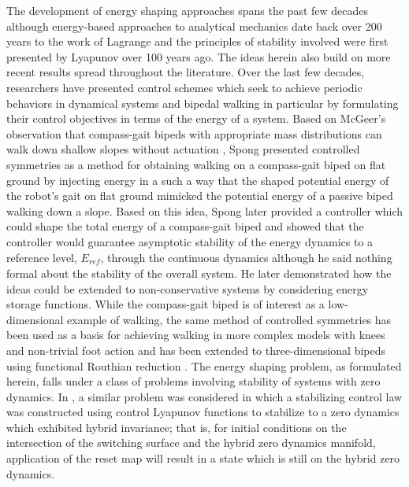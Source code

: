 \documentclass[english]{article}
\begin{document}
The development of energy shaping approaches spans the past few decades
although energy-based approaches to analytical mechanics date back over 200
years to the work of Lagrange
and the principles of stability involved were first presented by Lyapunov
over 100 years ago.
% 
The ideas herein also build on more recent results spread throughout the literature.
%
Over the last few decades, researchers have presented control schemes which seek
to achieve periodic behaviors in dynamical systems and bipedal walking in
particular by formulating their control objectives in terms of the energy of a
system.
%
Based on McGeer's observation that compass-gait bipeds with appropriate mass
distributions can walk down shallow slopes without actuation \cite{McGeer1990},
Spong presented controlled symmetries \cite{Spong2007} as a method for obtaining
walking on a compass-gait biped on flat ground by injecting energy in a such a
way that the shaped potential energy of the robot's gait on flat ground mimicked
the potential energy of a passive biped walking down a slope.
%
% 
Based on this idea, Spong later provided a controller which could shape the
total energy of a compass-gait biped and showed that the controller would
guarantee asymptotic stability of the energy dynamics to a reference level,
$E_{\mathit{ref}}$, through the continuous dynamics although he said nothing
formal about the stability of the overall system.
%
He later demonstrated how the ideas could be extended to non-conservative
systems \cite{Spong2007} by considering energy storage functions.
%
While the compass-gait biped is of interest as a low-dimensional example of
walking, the same method of controlled symmetries has been used as a basis for
achieving walking in more complex models with knees and non-trivial foot action
\cite{Sinnet2009} and has been extended to three-dimensional bipeds using
functional Routhian reduction \cite{Sinnet2009a}.
%
The energy shaping problem, as formulated herein, falls under a class of
problems involving stability of systems with zero dynamics.
%
In \cite{Ames2014}, a similar problem was considered in which a stabilizing
control law was constructed using control Lyapunov functions to stabilize to a
zero dynamics which exhibited hybrid invariance; that is, for initial conditions
on the intersection of the switching surface and the hybrid zero dynamics
manifold, application of the reset map will result in a state which is still on
the hybrid zero dynamics.
\end{document}
